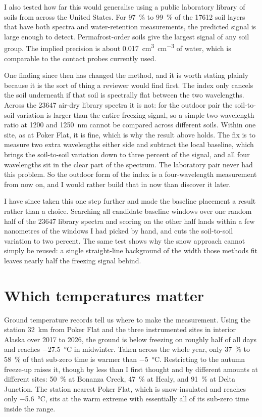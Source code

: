 \documentclass[11pt]{article}
\begin{document}
I also tested how far this would generalise using a public laboratory library
of soils from across the United States. For \SI{97}{\percent} to
\SI{99}{\percent} of the \num{17612} soil layers that have both spectra and
water-retention measurements, the predicted signal is large enough to detect.
Permafrost-order soils give the largest signal of any soil group. The implied
precision is about \SI{0.017}{\cubic\centi\meter\per\cubic\centi\meter} of
water, which is comparable to the contact probes currently used.

One finding since then has changed the method, and it is worth stating plainly
because it is the sort of thing a reviewer would find first. The index only
cancels the soil underneath if that soil is spectrally flat between the two
wavelengths. Across the \num{23647} air-dry library spectra it is not: for the
outdoor pair the soil-to-soil variation is larger than the entire freezing
signal, so a simple two-wavelength ratio at \num{1200} and
\SI{1250}{\nano\meter} cannot be compared across different soils. Within one
site, as at Poker Flat, it is fine, which is why the result above holds. The fix
is to measure two extra wavelengths either side and subtract the local
baseline, which brings the soil-to-soil variation down to three percent of the
signal, and all four wavelengths sit in the clear part of the spectrum. The
laboratory pair never had this problem. So the outdoor form of the index is a
four-wavelength measurement from now on, and I would rather build that in now
than discover it later.

I have since taken this one step further and made the baseline placement a
result rather than a choice. Searching all candidate baseline windows over one
random half of the \num{23647} library spectra and scoring on the other half
lands within a few nanometres of the windows I had picked by hand, and cuts
the soil-to-soil variation to two percent. The same test shows why the snow
approach cannot simply be reused: a single straight-line background of the
width those methods fit leaves nearly half the freezing signal behind.

\section{Which temperatures matter}

Ground temperature records tell us where to make the measurement. Using the
station \SI{32}{\kilo\meter} from Poker Flat and the three instrumented sites in
interior Alaska over 2017 to 2026, the ground is below freezing on roughly half
of all days and reaches \SI{-27.5}{\degreeCelsius} in midwinter. Taken across
the whole year, only \SI{37}{\percent} to \SI{58}{\percent} of that sub-zero
time is warmer than \SI{-5}{\degreeCelsius}. Restricting to the autumn
freeze-up raises it, though by less than I first thought and by different
amounts at different sites: \SI{50}{\percent} at Bonanza Creek,
\SI{47}{\percent} at Healy, and \SI{91}{\percent} at Delta Junction. The
station nearest Poker Flat, which is snow-insulated and reaches only
\SI{-5.6}{\degreeCelsius}, sits at the warm extreme with essentially all of its
sub-zero time inside the range.
\end{document}

